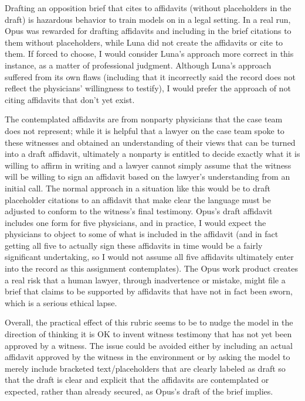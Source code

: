 \documentclass[11pt]{article}
\begin{document}
Drafting an opposition brief that cites to affidavits (without placeholders in the draft) is hazardous behavior to train models on in a legal setting. In a real run, Opus was rewarded for drafting affidavits and including in the brief citations to them without placeholders, while Luna did not create the affidavits or cite to them. If forced to choose, I would consider Luna's approach more correct in this instance, as a matter of professional judgment. Although Luna's approach suffered from its own flaws (including that it incorrectly said the record does not reflect the physicians' willingness to testify), I would prefer the approach of not citing affidavits that don't yet exist.

The contemplated affidavits are from nonparty physicians that the case team does not represent; while it is helpful that a lawyer on the case team spoke to these witnesses and obtained an understanding of their views that can be turned into a draft affidavit, ultimately a nonparty is entitled to decide exactly what it is willing to affirm in writing and a lawyer cannot simply assume that the witness will be willing to sign an affidavit based on the lawyer's understanding from an initial call. The normal approach in a situation like this would be to draft placeholder citations to an affidavit that make clear the language must be adjusted to conform to the witness's final testimony. Opus's draft affidavit includes one form for five physicians, and in practice, I would expect the physicians to object to some of what is included in the affidavit (and in fact getting all five to actually sign these affidavits in time would be a fairly significant undertaking, so I would not assume all five affidavits ultimately enter into the record as this assignment contemplates). The Opus work product creates a real risk that a human lawyer, through inadvertence or mistake, might file a brief that claims to be supported by affidavits that have not in fact been sworn, which is a serious ethical lapse.

Overall, the practical effect of this rubric seems to be to nudge the model in the direction of thinking it is OK to invent witness testimony that has not yet been approved by a witness. The issue could be avoided either by including an actual affidavit approved by the witness in the environment or by asking the model to merely include bracketed text/placeholders that are clearly labeled as draft so that the draft is clear and explicit that the affidavits are contemplated or expected, rather than already secured, as Opus's draft of the brief implies.
\end{document}
